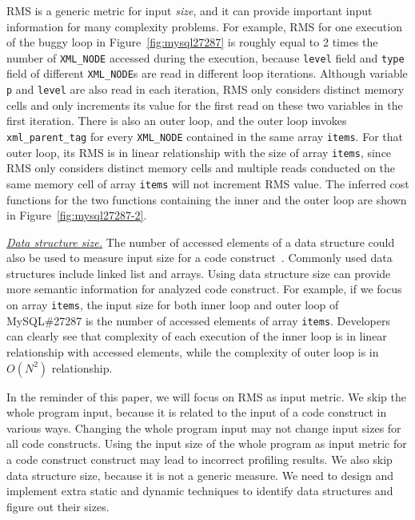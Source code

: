RMS is a generic metric for input \textit{size}, 
and it can provide important input information for many complexity problems.   
For example, 
RMS for one execution of
the buggy loop in Figure~\ref{fig:mysql27287}
is roughly equal to 2 times the number of \texttt{XML\_NODE} 
accessed during the execution, 
because \texttt{level} field and \texttt{type} field of 
different \texttt{XML\_NODE}s are read in different loop iterations.
Although variable \texttt{p} and \texttt{level} are also read in each iteration,
RMS only considers distinct memory cells and 
only increments its value for the first read on these two variables in the first iteration. 
There is also an outer loop, 
and the outer loop invokes \texttt{xml\_parent\_tag} 
for every \texttt{XML\_NODE} contained
in the same array \texttt{items}. 
For that outer loop, its RMS is in linear relationship 
with the size of array \texttt{items}, 
since RMS only considers distinct memory cells 
and multiple reads conducted on the same memory 
cell of array \texttt{items} will not increment RMS value. 
The inferred cost functions for the two functions 
containing the inner and the outer loop are shown 
in Figure~\ref{fig:mysql27287-2}.

{\underline{\textit{Data structure size.}}}
The number of accessed elements of a data 
structure could also be used to measure 
input size for a code construct~\cite{AlgoProf}. 
Commonly used data structures include linked list and arrays.
Using data structure size can provide more semantic information for 
analyzed code construct.
For example, if we focus on array \texttt{items}, 
the input size for both 
inner loop and outer loop of MySQL\#27287 is 
the number of accessed elements of array \texttt{items}.
Developers can clearly see that complexity of each execution 
of the inner loop is in linear relationship with accessed elements, 
while the complexity of outer loop is in $O(N^2)$ relationship. 

In the reminder of this paper, we will focus on RMS as input metric. 
We skip the whole program input, 
because it is related to the input of a code construct in various ways.
Changing the whole program input may not change input sizes for 
all code constructs. 
Using the input size of the whole program as input metric for a code construct
construct may lead to incorrect profiling results. 
We also skip data structure size,
because it is not a generic measure. 
We need to design and implement extra static and dynamic techniques 
to identify data structures and figure out their sizes.

